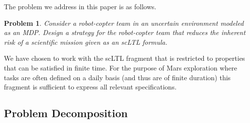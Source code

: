 \documentclass[conference]{IEEEtran}
\newtheorem{problem}{Problem}
\begin{document}
The problem we address in this paper is as follows.

\begin{problem}
\label{prob:basic}
Consider a robot-copter team in an uncertain environment modeled as an MDP.  Design a strategy for the robot-copter team that reduces the inherent risk of a scientific mission given as an scLTL formula.
\end{problem}

We have chosen to work with the scLTL fragment that is restricted to properties that can be satisfied in finite time. For the purpose of Mars exploration where tasks are often defined on a daily basis (and thus are of finite duration) this fragment is sufficient to express all relevant specifications.

\subsection{Problem Decomposition}
\end{document}
